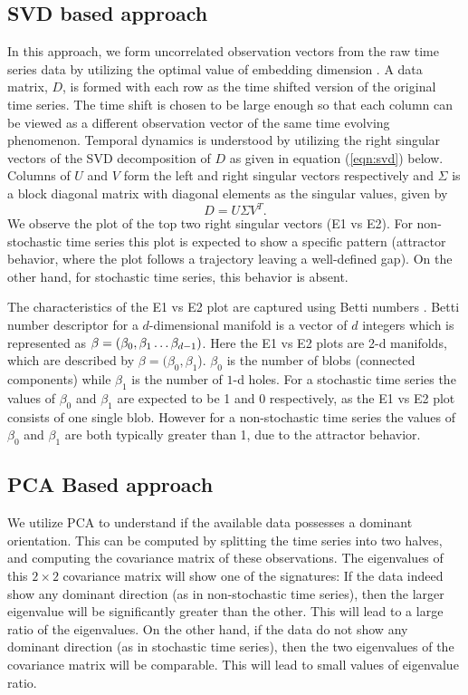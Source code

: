 \documentclass[10pt,conference]{IEEEtran}
\begin{document}
\subsection{SVD based approach}
In this approach, we form uncorrelated observation vectors from the raw time series data by utilizing the optimal value of embedding dimension \cite{misra2006}. A data matrix, $D$, is formed with each row  as the  time shifted version of the original time series. The time shift is chosen to be large enough so that each column can be viewed as a different observation vector of the same time evolving phenomenon. Temporal dynamics is understood by utilizing the right singular vectors of the SVD decomposition of $D$ as given in equation (\ref{eqn:svd}) below. Columns of $U$ and $V$  form the left and right singular vectors respectively and $\Sigma$ is a block diagonal matrix with diagonal elements as the singular values, given by
\begin{equation}
 D = U \Sigma V^T.
 \label{eqn:svd}
\end{equation}
  We observe the plot of the top two right singular vectors (E1 vs E2). For non-stochastic time series this plot is expected to show a specific pattern (attractor behavior, where the plot follows a trajectory leaving a well-defined gap). On the other hand, for stochastic time series, this behavior is absent.

The characteristics of the E1 vs E2 plot are captured using Betti numbers \cite{jmlr}. Betti number descriptor for a $d$-dimensional manifold is a vector of $d$ integers which is represented as $\beta = (\beta_0, \beta_1 \mathellipsis \beta_{d-1})$. Here the E1 vs E2 plots are 2-d manifolds, which are described by  $\beta=(\beta_{0}, \beta_{1}$).  $\beta_{0}$ is the number of blobs (connected components) while $\beta_1$ is the number of $1$-d holes. For a stochastic time series the values of $\beta_{0}$  and $\beta_1$ are expected to be 1 and 0 respectively, as the E1 vs E2 plot consists of one single blob. However for a non-stochastic time series the values of $\beta_{0}$ and $\beta_1$ are both typically greater than 1, due to the attractor behavior.


\subsection{PCA Based approach}
We utilize PCA to understand if the available data possesses a dominant orientation. This can be computed by splitting the time series into two halves, and computing the covariance matrix of these observations. The eigenvalues of this $2 \times 2$ covariance matrix will show one of the signatures: If the data indeed show any dominant direction (as in non-stochastic time series), then the larger eigenvalue will be significantly greater than the other. This will lead to a large ratio of the eigenvalues. On the other hand, if the data do not show any dominant direction (as in stochastic time series), then the two eigenvalues of the covariance matrix will be comparable. This will lead to small values of eigenvalue ratio.
\end{document}
